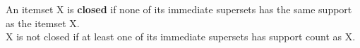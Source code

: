 
\begin{definition}
   An itemset X is \textbf{closed} if none of its immediate supersets
   has the same support as the itemset X.\\
   X is not closed if at least one of its immediate supersets
   has support count as X.
\end{definition}

